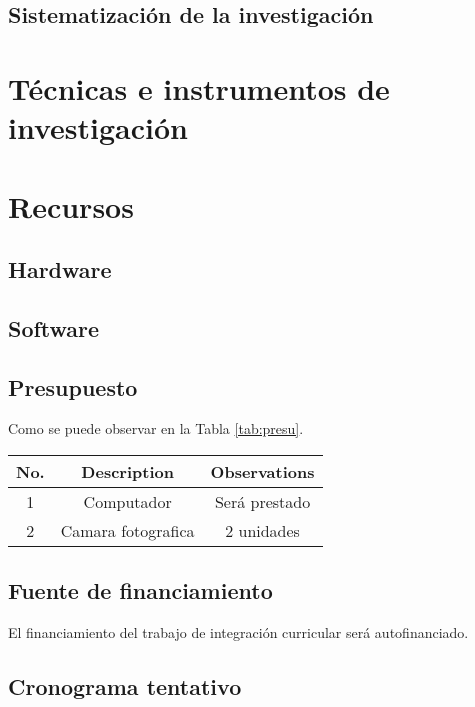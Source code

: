 \subsection{Sistematización de la investigación}


\section{Técnicas e instrumentos de investigación} %


\section{Recursos}
\subsection{Hardware}





\subsection{Software}
\subsection{Presupuesto}
Como se puede observar en la Tabla \ref{tab:presu}.
\newpage

\begin{sidewaystable}
    \centering
    \begin{tabular}{|c|c|c|}
    \hline
         No.& Description&Observations\\
         \hline
         1&Computador& Será prestado \\
         2& Camara fotografica& 2 unidades\\
    \hline
    \end{tabular}
    \caption{Caption}
    \label{tab:presu}
\end{sidewaystable}
\newpage

\subsection{Fuente de financiamiento}
El financiamiento del trabajo de integración curricular será autofinanciado.
\subsection{Cronograma tentativo} %

